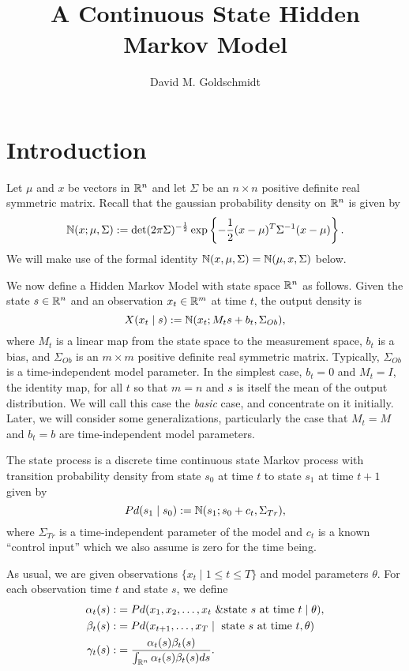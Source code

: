 \documentclass[12pt,leqno]{article}
\title{A Continuous State Hidden Markov Model}
\author{David M. Goldschmidt}
\begin{document}
\newcommand{\p}{\ensuremath{u}}
\newcommand{\VV}{V}
\maketitle


\section{Introduction}
Let $\mu$ and $x$ be vectors in ${\mathbb R}^n$ and let $\Sigma$ be an $n\times{n}$ positive
definite real symmetric matrix.  Recall that the gaussian probability density
on ${\mathbb R}^n$ is given by 
$$
{\mathbb N}(x;\mu,\Sigma) := \det(2\pi\Sigma)^{-\frac{1}{2}}\exp\left\{-\frac{1}{2}
(x - \mu)^T\Sigma^{-1}(x-\mu)\right\}.
$$
We will make use of the formal identity ${\mathbb N}(x,\mu,\Sigma) = {\mathbb N}(\mu,x,\Sigma)$ below.

We now define a Hidden Markov Model with state space ${\mathbb R}^n$ as follows.  Given the state $s\in{\mathbb R}^n$ and an observation $x_t\in{\mathbb R}^m$ at time $t$, the output density is
$$
X(x_t\mid s) := {\mathbb N}(x_t;M_ts + b_t,\Sigma_{Ob}),
$$
where $M_t$ is a linear map from the state space to the
measurement space, $b_t$ is a bias, and $\Sigma_{Ob}$ is an $m\times{m}$ positive definite real symmetric matrix.  Typically, $\Sigma_{Ob}$ is a time-independent model parameter.
In the simplest case, $b_t = 0$  and $M_t = I$, the identity map, for all $t$ so that $m = n$ and $s$ is itself the mean of the output distribution.  We will call this case the {\em basic} case, and concentrate on it initially. Later, we will consider some generalizations, particularly the case that $M_t = M$ and $b_t = b$ are time-independent model parameters.

The state process is a discrete time continuous state Markov process with transition probability density
from state $s_0$ at time $t$ to state $s_1$ at time $t+1$ given by
$$
Pd(s_1\mid s_0) :=  {\mathbb N}(s_1;s_0+c_t,\Sigma_{Tr}),
$$
where $\Sigma_{Tr}$ is a time-independent parameter of the model
and $c_t$ is a known ``control input'' which we also assume is zero for the time being.

As usual, we are given observations $\{x_t\mid 1\le t\le T\}$ and model parameters $\theta$.  For each observation time $t$ and state $s$, we define
\begin{align*}
  \alpha_t(s) :&= Pd(x_1,x_2,\dots,x_t~ \& \text{state $s$ at time $t$}\mid \theta ),\\
  \beta_t(s) :&= Pd(x_{t+1},\dots,x_T \mid ~\text{state $s$ at time $t$},\theta)\\
  \gamma_t(s) :&= \frac{\alpha_t(s)\beta_t(s)}{\int_{{\mathbb R}^n}\alpha_t(s)\beta_t(s)ds}.
\end{align*}
\end{document}
